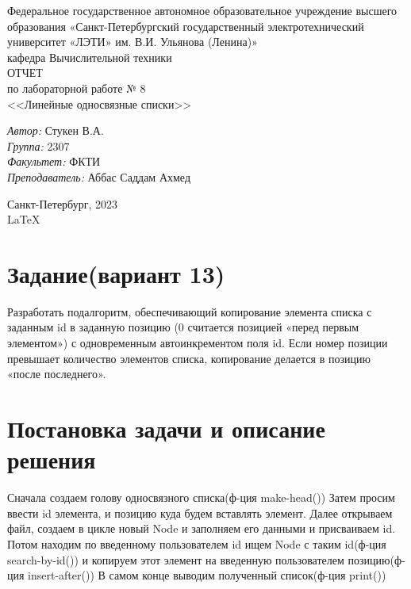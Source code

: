 \documentclass[a4paper,12pt]{report}
\begin{document}
 

\begin{titlepage} 

\begin{center} 

\large Федеральное государственное автономное образовательное учреждение высшего образования «Санкт-Петербургский государственный электротехнический университет «ЛЭТИ» им. В.И. Ульянова (Ленина)»\\
кафедра Вычислительной техники\\[5cm] 

\huge ОТЧЕТ\\ по лабораторной работе № 8\\[0.5cm] 
\large <<Линейные односвязные списки>>\\[3.7cm]

\begin{minipage}{1\textwidth}
    \begin{flushleft}
        \emph{Автор:} Стукен В.А.\\
        \emph{Группа:} 2307\\
        \emph{Факультет:} ФКТИ\\
        \emph{Преподаватель:} Аббас Саддам Ахмед\\
    \end{flushleft}
\end{minipage}

\vfill

Санкт-Петербург, 2023\\
{\large \LaTeX}

\end{center}
\thispagestyle{empty}
\end{titlepage}

\section*{Задание(вариант 13)}
Разработать подалгоритм, обеспечивающий копирование элемента списка с заданным id в заданную позицию 
(0 считается позицией «перед первым элементом») с одновременным автоинкрементом поля id. 
Если номер позиции превышает количество элементов списка, копирование делается в позицию «после последнего».
\section*{Постановка задачи и описание решения}
\par

Сначала создаем голову односвязного списка(ф-ция make-head()) Затем просим ввести id элемента, и позицию куда будем вставлять элемент.
Далее открываем файл, создаем в цикле новый Node и заполняем его данными и присваиваем id. Потом находим по введенному пользователем id ищем Node с таким id(ф-ция search-by-id()) и копируем этот элемент на введенную пользователем позицию(ф-ция insert-after())
В самом конце выводим полученный список(ф-ция print())
\end{document}
